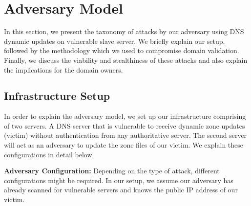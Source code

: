\section{Adversary Model}

In this section, we present the taxonomy of attacks by our adversary using DNS dynamic updates on vulnerable slave server. We briefly explain our setup, followed by the methodology which we used to compromise domain validation. Finally, we discuss the viability and stealthiness of these attacks and also explain the implications for the domain owners. 


\subsection{Infrastructure Setup}

In order to explain the adversary model, we set up our infrastructure comprising of two servers. A DNS server that is vulnerable to receive  dynamic zone updates (victim) without authentication from any authoritative server. The second server will act as an adversary to update the zone files of our victim.  We explain these configurations in detail below. 


\textbf{Adversary Configuration:} Depending on the type of attack, different configurations might be required. In our setup, we assume our adversary has already scanned for vulnerable servers and knows the public IP address of our victim. 



